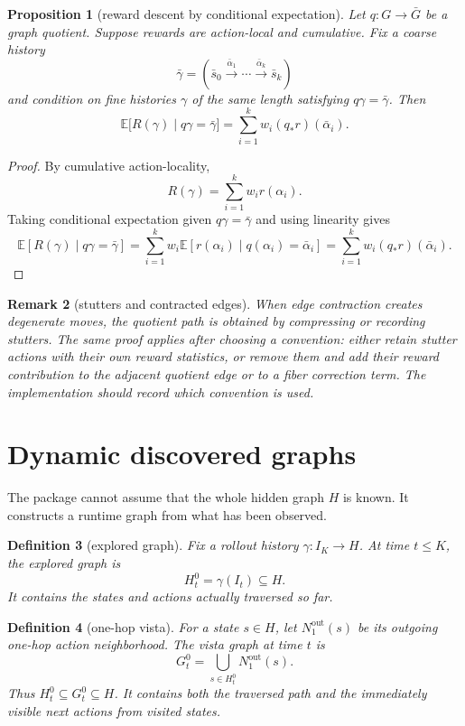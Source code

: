 \documentclass[11pt]{article}
\newtheorem{definition}{Definition}[section]
\newtheorem{remark}[definition]{Remark}
\newtheorem{proposition}[definition]{Proposition}
\newcommand{\E}{\mathbb{E}}
\begin{document}
\begin{proposition}[reward descent by conditional expectation]\label{prop:reward-descent}
Let \(q:G\to \bar G\) be a graph quotient.  Suppose rewards are action-local and cumulative.  Fix a coarse history
\[
    \bar\gamma=(\bar s_0\xrightarrow{\bar\alpha_1}\cdots\xrightarrow{\bar\alpha_k}\bar s_k)
\]
and condition on fine histories \(\gamma\) of the same length satisfying \(q\gamma=\bar\gamma\).  Then
\[
    \E\bigl[R(\gamma)\mid q\gamma=\bar\gamma\bigr]
    =\sum_{i=1}^{k} w_i (q_*r)(\bar\alpha_i).
\]
\end{proposition}

\begin{proof}
By cumulative action-locality,
\[
    R(\gamma)=\sum_{i=1}^{k}w_i r(\alpha_i).
\]
Taking conditional expectation given \(q\gamma=\bar\gamma\) and using linearity gives
\[
    \E[R(\gamma)\mid q\gamma=\bar\gamma]
    =\sum_{i=1}^{k}w_i\E[r(\alpha_i)\mid q(\alpha_i)=\bar\alpha_i]
    =\sum_{i=1}^{k}w_i(q_*r)(\bar\alpha_i).
\]
\end{proof}

\begin{remark}[stutters and contracted edges]
When edge contraction creates degenerate moves, the quotient path is obtained by compressing or recording stutters.  The same proof applies after choosing a convention: either retain stutter actions with their own reward statistics, or remove them and add their reward contribution to the adjacent quotient edge or to a fiber correction term.  The implementation should record which convention is used.
\end{remark}

\section{Dynamic discovered graphs}

The package cannot assume that the whole hidden graph \(H\) is known.  It constructs a runtime graph from what has been observed.

\begin{definition}[explored graph]
Fix a rollout history \(\gamma:I_K\to H\).  At time \(t\le K\), the explored graph is
\[
    H^0_t=\gamma(I_t)\subseteq H.
\]
It contains the states and actions actually traversed so far.
\end{definition}

\begin{definition}[one-hop vista]
For a state \(s\in H\), let \(N^{\mathrm{out}}_1(s)\) be its outgoing one-hop action neighborhood.  The vista graph at time \(t\) is
\[
    G^0_t=\bigcup_{s\in H^0_t}N^{\mathrm{out}}_1(s).
\]
Thus \(H^0_t\subseteq G^0_t\subseteq H\).  It contains both the traversed path and the immediately visible next actions from visited states.
\end{definition}
\end{document}

